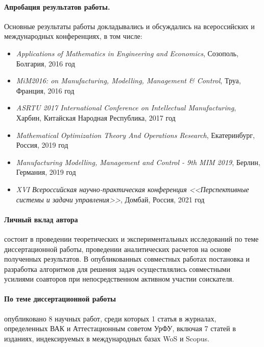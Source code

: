 \paragraph*{Апробация результатов работы.}
Основные результаты работы докладывались и обсуждались на всероссийских и международных конференциях, в том числе:

\begin{itemize}
    \item
    \textit{Applications of Mathematics in Engineering and Economics},
    Созополь, Болгария, 2016 год
    \item
    \textit{MiM2016: on Manufacturing, Modelling, Management \& Control},
    Труа, Франция, 2016 год
    \item
    \textit{ASRTU 2017 International Conference on Intellectual Manufacturing},
    Харбин, Китайская Народная Республика, 2017 год
    \item
    \textit{Mathematical Optimization Theory And Operations Research},
    Екатеринбург, Россия, 2019 год
    \item
    \textit{Manufacturing Modelling, Management and Control - 9th MIM 2019},
    Берлин, Германия, 2019 год
    \item
    \textit{XVI Всероссийская научно-практическая конференция
    <<Перспективные системы и задачи управления>>},
    Домбай, Россия, 2021 год
\end{itemize}

\paragraph*{Личный вклад автора}
состоит в проведении теоретических и экспериментальных исследований
по теме диссертационной работы,
проведении аналитических расчетов на основе полученных результатов.
В опубликованных совместных работах постановка и разработка алгоритмов для
решения задач осуществлялись совместными усилиями соавторов
при непосредственном активном участии соискателя.

\paragraph*{По теме диссертационной работы}
опубликовано 8 научных работ,
среди которых 1 статья в журналах, определенных ВАК и Аттестационным советом УрФУ,
включая 7 статей в изданиях, индексируемых в международных базах WoS и Scopus.
